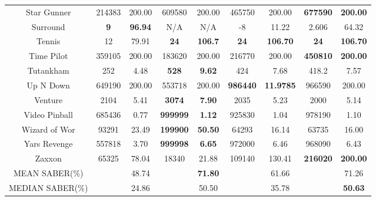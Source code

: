 \documentclass[nohyperref]{article}
\def\GDIHmeanSABER{71.26}
\def\GDIHmedianSABER{50.63}
\def\GDIImeanSABER{61.66}
\def\GDIImedianSABER{35.78}
\def\mueslimeanSABER{48.74}
\def\mueslimedianSABER{24.86}
\def\goexploremeanSABER{71.80}
\def\goexploremedianSABER{50.50}
\newcommand{\best}[1]{\textbf{#1}}
\theoremstyle{plain}
\begin{document}
\begin{table}[!hb]
\begin{center}
\begin{tabular}{| c | c c |  c c| c c| c c|}
 Star Gunner    &214383        &200.00              &609580      &200.00                         & 465750     &200.00&\textbf{677590}          &\textbf{200.00}     \\
 Surround       &\textbf{9}    &\textbf{96.94}      &N/A                    &N/A                            & -8         &11.22                 &2.606           &64.32\\
 Tennis         &12            &79.91               &\best{24}              &\best{106.7}                   & \best{24}         &\best{106.70   }&\textbf{24}           &\textbf{106.70}            \\
 Time Pilot     &359105 &200.00   &183620                &200.00                         & 216770     & 200.00               &\textbf{450810}          &\textbf{200.00}\\
 Tutankham      &252           &4.48                &\textbf{528}           &\textbf{9.62}                  & 424               &7.68           &418.2           &7.57\\
 Up N Down      &649190        &200.00              &553718                &200.00                         & \best{986440}     &\best{11.9785}  &966590        &200.00         \\
 Venture        &2104          &5.41                &\textbf{3074}         &\textbf{7.90}                  & 2035              &5.23            &2000            &5.14\\
 Video Pinball  &685436        &0.77                &\textbf{999999}       &\textbf{1.12}                  & 925830            &1.04            &978190          &1.10\\
 Wizard of Wor  &93291         &23.49               &\textbf{199900}       &\textbf{50.50}                 & 64293             &16.14           &63735           &16.00\\
 Yars Revenge   &557818        &3.70                &\textbf{999998}       &\textbf{6.65}                  & 972000            &6.46            &968090          &6.43\\
 Zaxxon         &65325         &78.04               &18340                 &21.88                          & 109140         &130.41   &\textbf{216020} &\textbf{200.00}        \\
\hline    
MEAN SABER(\%)  &              & \mueslimeanSABER              &                       & \textbf{\goexploremeanSABER}                &                   & \GDIImeanSABER &      &\GDIHmeanSABER\\
\hline
MEDIAN SABER(\%)&              &  \mueslimedianSABER             &                       &\goexploremedianSABER                 &                   & \GDIImedianSABER &      & \textbf{\GDIHmedianSABER}  \\
\hline
\end{tabular}
\end{center}
\end{table}
\end{document}
